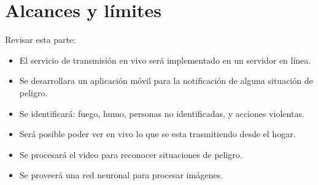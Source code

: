 \section{Alcances y límites}

Revisar esta parte:

\begin{itemize}
    \item El servicio de transmisión en vivo será implementado en un servidor en línea.
    \item Se desarrollara un aplicación móvil para la notificación de alguna situación de peligro.
    \item Se identificará: fuego, humo, personas no identificadas, y acciones violentas.
    \item Será posible poder ver en vivo lo que se esta trasmitiendo desde el hogar.
    \item Se procesará el video para reconocer situaciones de peligro.
    \item Se proveerá una red neuronal para procesar imágenes.
\end{itemize}